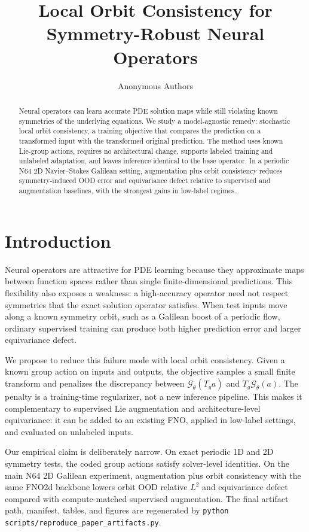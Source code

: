 \documentclass[10pt]{article}
\title{Local Orbit Consistency for Symmetry-Robust Neural Operators}
\author{Anonymous Authors}
\date{}
\begin{document}
\maketitle

\begin{abstract}
Neural operators can learn accurate PDE solution maps while still violating known symmetries of the underlying equations. We study a model-agnostic remedy: stochastic local orbit consistency, a training objective that compares the prediction on a transformed input with the transformed original prediction. The method uses known Lie-group actions, requires no architectural change, supports labeled training and unlabeled adaptation, and leaves inference identical to the base operator. In a periodic N64 2D Navier--Stokes Galilean setting, augmentation plus orbit consistency reduces symmetry-induced OOD error and equivariance defect relative to supervised and augmentation baselines, with the strongest gains in low-label regimes.
\end{abstract}

\section{Introduction}
Neural operators are attractive for PDE learning because they approximate maps between function spaces rather than single finite-dimensional predictions. This flexibility also exposes a weakness: a high-accuracy operator need not respect symmetries that the exact solution operator satisfies. When test inputs move along a known symmetry orbit, such as a Galilean boost of a periodic flow, ordinary supervised training can produce both higher prediction error and larger equivariance defect.

We propose to reduce this failure mode with local orbit consistency. Given a known group action on inputs and outputs, the objective samples a small finite transform and penalizes the discrepancy between \(\mathcal G_\theta(T_g a)\) and \(T_g\mathcal G_\theta(a)\). The penalty is a training-time regularizer, not a new inference pipeline. This makes it complementary to supervised Lie augmentation and architecture-level equivariance: it can be added to an existing FNO, applied in low-label settings, and evaluated on unlabeled inputs.

Our empirical claim is deliberately narrow. On exact periodic 1D and 2D symmetry tests, the coded group actions satisfy solver-level identities. On the main N64 2D Galilean experiment, augmentation plus orbit consistency with the same FNO2d backbone lowers orbit OOD relative \(L^2\) and equivariance defect compared with compute-matched supervised augmentation. The final artifact path, manifest, tables, and figures are regenerated by \texttt{python scripts/reproduce\_paper\_artifacts.py}.








\end{document}
